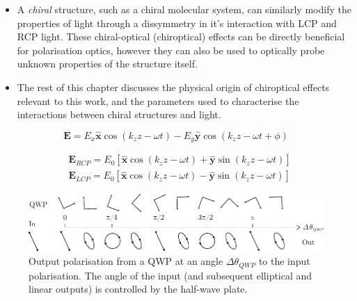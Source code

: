 \begin{itemize}
    \item A \textit{chiral} structure, such as a chiral molecular system, can similarly modify the properties of light through a dissymmetry in it's interaction with LCP and RCP light. These chiral-optical (chiroptical) effects can be directly beneficial for polarisation optics, however they can also be used to optically probe unknown properties of the structure itself. 
    \item The rest of this chapter discusses the physical origin of chiroptical effects relevant to this work, and the parameters used to characterise the interactions between chiral structures and light.

\end{itemize}

\begin{equation} \label{eq:background:chirality:generalwave}
    \mathbf{E}= E_x  \mathbf{\hat{x}} \cos(k_z z-\omega t) - E_y \mathbf{\hat{y}} \cos(k_z z-\omega t +\phi)
\end{equation}

\begin{equation} \label{eq:background:chirality:CPL}
    \begin{split}
        & \mathbf{E}_{RCP} = E_0 \left[ \mathbf{\hat{x}} \cos(k_z z-\omega t) + \mathbf{\hat{y}} \sin(k_z z-\omega t )\right]\\
        & \mathbf{E}_{LCP}= E_0 \left[ \mathbf{\hat{x}} \cos(k_z z-\omega t) - \mathbf{\hat{y}} \sin(k_z z-\omega t )\right]
    \end{split}
\end{equation}

\begin{figure}[htb!]
    \centering
    \includegraphics[scale=1.0]{./figures/background/chiroptics/QWP_in_out.pdf}
    \caption{\label{fig:QWP_in_out}Output polarisation from a QWP at an angle $\Delta\theta_{QWP}$ to the input polarisation. The angle of the input (and subsequent elliptical and linear outputs) is controlled by the half-wave plate.}
\end{figure}


